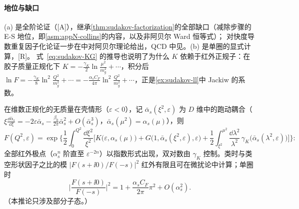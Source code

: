 \paragraph{地位与缺口}(a) 是全阶论证（[A]），继承\cref{thm:sudakov-factorization}的全部缺口（减除步骤的 E-S 地位，即\cref{asm:appN-collins}的内容，以及非阿贝尔 Ward 恒等式）；
对快度导数重复因子化论证一步在\cite[第~10.10~节]{Collins2011}中对阿贝尔理论给出，QCD 中见\cite{Collins:1989bt,Magnea:1990zb}。(b) 是单圈的显式计算，[R]。
式~\eqref{eq:sudakov-KG} 的推导也说明了为什么 $K$ 依赖于红外正规子：在胶子质量正规化下 $K=-\frac{\gamma_K}2\ln\frac{\mu^2}{m_g^2}+\cdots$，积分后
$\ln F=-\frac{\gamma_K}8\ln^2\frac{Q^2}{m_g^2}+\cdots=-\frac{\alpha_sC_F}{4\pi}\ln^2\frac{Q^2}{m_g^2}+\cdots$，正是\cref{ex:sudakov-ll}中 Jackiw 的系数。

\begin{corollary}\label{cor:sudakov-exponentiation}
在维数正规化的无质量在壳情形（$\varepsilon<0$），记 $\bar\alpha_s(\xi^2,\varepsilon)$ 为 $D$ 维中的跑动耦合（$\xi\frac{\dd\bar\alpha_s}{\dd\xi}=-2\varepsilon\bar\alpha_s-\frac{\beta_0}{2\pi}\bar\alpha_s^2+O(\bar\alpha_s^3)$，$\bar\alpha_s(\mu^2)=\alpha_s(\mu)$），则
\begin{equation}\label{eq:sudakov-expo}
F(Q^2,\varepsilon)=\exp\Big\{\frac12\int_0^{Q^2}\frac{\dd\xi^2}{\xi^2}\Big[K\big(\varepsilon,\alpha_s(\mu)\big)+G\big(1,\bar\alpha_s(\xi^2,\varepsilon),\varepsilon\big)
+\frac12\int_{\xi^2}^{\mu^2}\frac{\dd\lambda^2}{\lambda^2}\,\gamma_K\big(\bar\alpha_s(\lambda^2,\varepsilon)\big)\Big]\Big\}:
\end{equation}
全部红外极点（$\alpha_s^n$ 阶直至 $\varepsilon^{-2n}$）以指数形式出现，双对数由 $\gamma_K$ 控制。类时与类空形状因子之比的模
$|F(s+\ii0)/F(-s)|^2$ 红外有限且可在微扰论中计算\cite{Magnea:1990zb}；单圈时
\begin{equation}\label{eq:sudakov-ratio}
\Big|\frac{F(s+\ii0)}{F(-s)}\Big|^2=1+\frac{\alpha_sC_F}{2\pi}\pi^2+O(\alpha_s^2).
\end{equation}
（本推论只涉及部分子态。）
\end{corollary}

